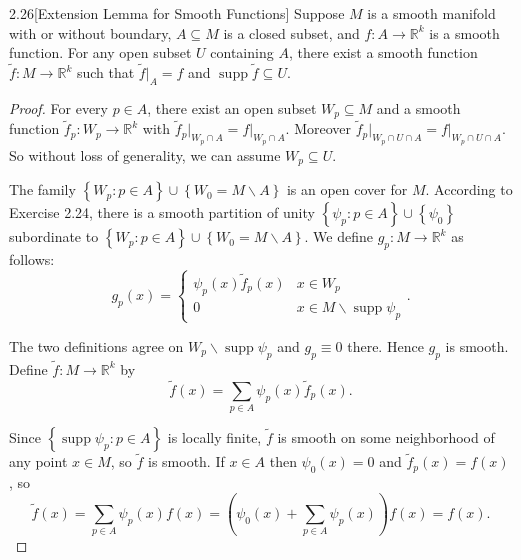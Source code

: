 \begin{lemma}{2.26}[Extension Lemma for Smooth Functions]
    Suppose \(M\) is a smooth manifold with or without boundary, \(A \subseteq M\) is a closed subset, and \(f: A \to \mathbb{R}^{k}\) is a smooth function. For any open subset \(U\) containing \(A\), there exist a smooth function \(\widetilde{f}: M \to \mathbb{R}^{k}\) such that \(\widetilde{f}\vert_{A} = f\) and \( \operatorname{supp} \widetilde{f} \subseteq U\).
\end{lemma}

\begin{proof}
    For every \(p \in A\), there exist an open subset \(W_{p} \subseteq M\) and a smooth function \(\widetilde{f}_{p}: W_{p} \to \mathbb{R}^{k}\) with \( \widetilde{f}_{p}\vert_{W_{p} \cap A} = f\vert_{W_{p} \cap A} \). Moreover \( \widetilde{f}_{p}\vert_{W_{p} \cap U \cap A} = f\vert_{W_{p} \cap U \cap A} \). So without loss of generality, we can assume \( W_{p} \subseteq U \).

    The family \( \left\{ W_{p} : p \in A \right\} \cup \left\{ W_{0} = M \smallsetminus A \right\} \) is an open cover for \( M \). According to Exercise 2.24, there is a smooth partition of unity \( \left\{ \psi_{p} : p \in A \right\} \cup \left\{ \psi_{0} \right\} \) subordinate to \( \left\{ W_{p} : p \in A \right\} \cup \left\{ W_{0} = M \smallsetminus A \right\} \). We define \( g_{p}: M \to \mathbb{R}^{k} \) as follows:
    \[
        g_{p}(x) = \begin{cases}
            \psi_{p}(x) \widetilde{f}_{p}(x) & x \in W_{p}                                         \\
            0                                & x \in M \smallsetminus \operatorname{supp} \psi_{p}
        \end{cases}.
    \]

    The two definitions agree on \( W_{p} \smallsetminus \operatorname{supp} \psi_{p} \) and \( g_{p} \equiv 0 \) there. Hence \( g_{p} \) is smooth. Define \( \widetilde{f}: M \to \mathbb{R}^{k} \) by
    \[
        \widetilde{f}(x) = \sum_{p \in A} \psi_{p}(x)\widetilde{f}_{p}(x).
    \]

    Since \( \left\{ \operatorname{supp} \psi_{p}: p \in A \right\} \) is locally finite, \( \widetilde{f} \) is smooth on some neighborhood of any point \( x \in M \), so \( \widetilde{f} \) is smooth. If \( x \in A \) then \( \psi_{0}(x) = 0 \) and \( \widetilde{f}_{p}(x) = f(x) \), so
    \[
        \widetilde{f}(x) = \sum_{p \in A} \psi_{p}(x) f(x) = \left( \psi_{0}(x) + \sum_{p \in A} \psi_{p}(x) \right) f(x) = f(x).
    \]


\end{proof}
